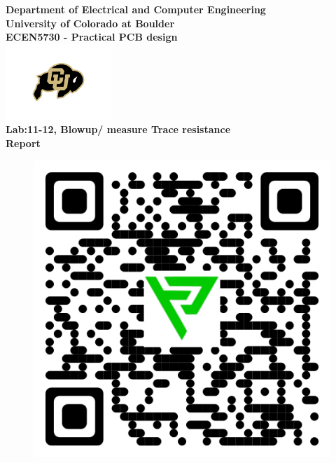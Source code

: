 \begin{titlepage}
\center %

\textbf{\large Department of Electrical and Computer Engineering}\\[0.5cm]
\textbf{\Large University of Colorado at Boulder}\\[1cm]
\textbf{\large ECEN5730 - Practical PCB design}\\[2cm]
\includegraphics[width=0.3\textwidth]{figures/cu}\\[2cm] 

	

\textbf{\Huge Lab:11-12, Blowup/ measure Trace resistance}\\[0.2cm]

\textbf{\Large Report}\\[2cm]
\vspace{1.5cm}
\begin{figure}[H]
	\centering
	\includegraphics[scale=0.2]{figures/qr_download.png}
	\label{555_schematic}
\end{figure}\vspace{1.5cm}



\end{titlepage}
